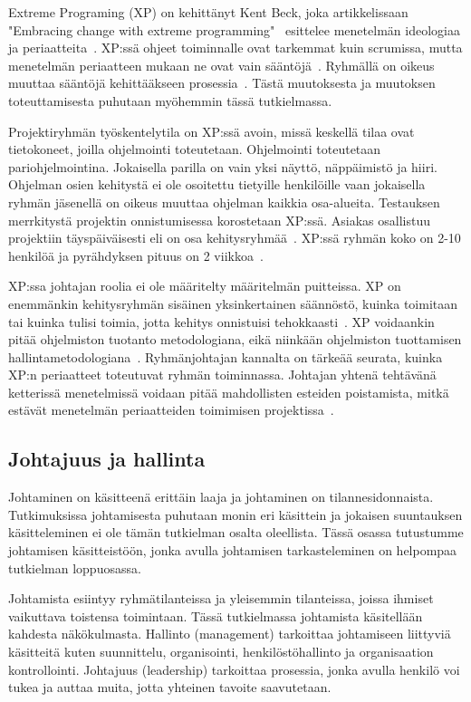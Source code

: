 \documentclass[finnish]{tktltiki2}
\theoremstyle{definition}
\theoremstyle{remark}
\begin{document}
Extreme Programing (XP) on kehittänyt Kent Beck, joka artikkelissaan "Embracing change with extreme programming"  \ esittelee menetelmän ideologiaa ja periaatteita~\cite{796139}. XP:ssä ohjeet toiminnalle ovat tarkemmat kuin scrumissa, mutta menetelmän periaatteen mukaan ne ovat vain sääntöjä~\cite{cohen2004introduction}. Ryhmällä on oikeus muuttaa sääntöjä kehittääkseen prosessia~\cite{cohen2004introduction}. Tästä muutoksesta ja muutoksen toteuttamisesta puhutaan myöhemmin tässä tutkielmassa.

Projektiryhmän työskentelytila on XP:ssä avoin, missä keskellä tilaa ovat tietokoneet, joilla ohjelmointi toteutetaan. Ohjelmointi toteutetaan pariohjelmointina. Jokaisella parilla on vain yksi näyttö, näppäimistö ja hiiri. Ohjelman osien kehitystä ei ole osoitettu tietyille henkilöille vaan jokaisella ryhmän jäsenellä on oikeus muuttaa ohjelman kaikkia osa-alueita. Testauksen merrkitystä projektin onnistumisessa korostetaan XP:ssä. Asiakas osallistuu projektiin täyspäiväisesti eli on osa kehitysryhmää~\cite{796139}. XP:ssä ryhmän koko on 2-10 henkilöä ja pyrähdyksen pituus on 2 viikkoa~\cite{cohen2004introduction}. 

XP:ssa johtajan roolia ei ole määritelty määritelmän puitteissa. XP on enemmänkin kehitysryhmän sisäinen yksinkertainen säännöstö, kuinka toimitaan tai kuinka tulisi toimia, jotta kehitys onnistuisi tehokkaasti~\cite{Augustine:2005:APM:1101779.1101781}. XP voidaankin pitää ohjelmiston tuotanto metodologiana, eikä niinkään ohjelmiston tuottamisen hallintametodologiana~\cite{cohen2004introduction}. Ryhmänjohtajan kannalta on tärkeää seurata, kuinka XP:n periaatteet toteutuvat ryhmän toiminnassa. Johtajan yhtenä tehtävänä  ketterissä menetelmissä voidaan pitää mahdollisten esteiden poistamista, mitkä estävät menetelmän periaatteiden toimimisen projektissa~\cite{Augustine:2005:APM:1101779.1101781}.

\subsection{Johtajuus ja hallinta}

Johtaminen on käsitteenä erittäin laaja ja johtaminen on tilannesidonnaista. Tutkimuksissa johtamisesta puhutaan monin eri käsittein ja jokaisen suuntauksen käsitteleminen ei ole tämän tutkielman osalta oleellista. Tässä osassa tutustumme johtamisen käsitteistöön, jonka avulla johtamisen tarkasteleminen on helpompaa tutkielman loppuosassa.

Johtamista esiintyy ryhmätilanteissa ja yleisemmin tilanteissa, joissa ihmiset vaikuttava toistensa toimintaan. Tässä tutkielmassa johtamista käsitellään kahdesta näkökulmasta. Hallinto (management) tarkoittaa johtamiseen liittyviä käsitteitä kuten suunnittelu, organisointi, henkilöstöhallinto ja organisaation kontrollointi. Johtajuus (leadership) tarkoittaa prosessia, jonka avulla henkilö voi tukea ja auttaa muita, jotta yhteinen tavoite saavutetaan.
\end{document}
